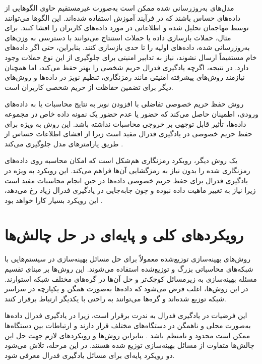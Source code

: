 مدل‌های به‌روزرسانی‌ شده ممکن است به‌صورت غیرمستقیم حاوی الگوهایی از داده‌های حساس باشند که در فرآیند آموزش استفاده شده‌اند. این الگوها می‌توانند توسط مهاجمان تحلیل شده و اطلاعاتی در مورد داده‌های کاربران را افشا کنند. برای مثال، حملات بازسازی داده یا حملات استنتاج می‌توانند با دسترسی به وزن‌های به‌روزرسانی شده، داده‌های اولیه را تا حدی بازسازی کنند. بنابراین، حتی اگر داده‌های خام مستقیماً ارسال نشوند، نیاز به تدابیر امنیتی برای جلوگیری از این نوع حملات وجود دارد. در نتیجه، اگرچه یادگیری فدرال حریم شخصی را بهتر حفظ می‌کند، اما همچنان نیازمند روش‌های پیشرفته امنیتی مانند رمزنگاری، تنظیم نویز در داده‌ها و روش‌های دیگر برای تضمین حفاظت از حریم شخصی کاربران است.


روش حفظ حریم خصوصی تفاضلی%
با افزودن نویز به نتایج محاسبات یا به داده‌های ورودی، اطمینان حاصل می‌کند که حضور یا عدم حضور یک نمونه داده خاص در مجموعه داده‌ها، تأثیر قابل توجهی بر خروجی محاسبات نداشته باشد. این روش به ویژه برای حفظ حریم خصوصی در یادگیری فدرال مفید است زیرا از افشای اطلاعات حساس از طریق پارامترهای مدل جلوگیری می‌کند
\cite{hasan2023security}.

یک روش دیگر، رویکرد رمزنگاری هم‌شکل%
است که امکان محاسبه روی داده‌های رمزنگاری شده را بدون نیاز به رمزگشایی آن‌ها فراهم می‌کند. این رویکرد به ویژه در یادگیری فدرال برای حفظ حریم خصوصی داده‌ها در حین انجام محاسبات مفید است زیرا نیاز به تغییر ماهیت داده نبوده و چون جابه‌جایی در یادگیری فدرال زیاد رخ می‌دهد، این رویکرد بسیار کارا خواهد بود
\cite{yin2021comprehensive}.



\section{رویکردهای کلی و پایه‌ای در حل چالش‌ها}
روش‌های بهینه‌سازی توزیع‌شده معمولاً برای حل مسائل بهینه‌سازی در سیستم‌هایی با شبکه‌های محاسباتی بزرگ و توزیع‌شده استفاده می‌شوند. این روش‌ها بر مبنای تقسیم مسئله بهینه‌سازی به زیرمسائل کوچک‌تر و حل آن‌ها در گره‌های مختلف شبکه استوارند. در این روش‌ها، اغلب فرض می‌شود که داده‌ها به‌صورت همگن و یکپارچه در سراسر شبکه توزیع شده‌اند و گره‌ها می‌توانند به راحتی با یکدیگر ارتباط برقرار کنند.

این فرضیات در یادگیری فدرال به ندرت برقرار است، زیرا در یادگیری فدرال داده‌ها به‌صورت محلی و ناهمگن در دستگاه‌های مختلف قرار دارند و ارتباطات بین دستگاه‌ها ممکن است محدود و نامنظم باشد
\cite{konevcny2015federated}.
بنابراین روش‌ها و رویکردهای لازم جهت حل این چالش‌ها متفاوت از مسائل بهینه‌سازی توزیع شده هستند. در این مرحله، تلاش می‌شود دو رویکرد پایه‌ای برای مسائل یادگیری فدرال معرفی شود.


